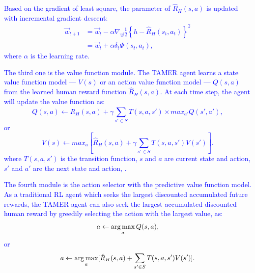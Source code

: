 \textcolor{blue}{Based on the gradient of least square, the parameter of $\hat{R}_{H}(s, a)$ is updated with incremental gradient descent:
\begin{equation}
\begin{aligned}
\vec{w}_{t+1} &= \vec{w}_{t} - \alpha\nabla_{\vec{w}} \frac{1}{2} \left\{h - \hat{R}_{H}(s_{t}, a_{t})\right\}^{2} \\
&= \vec{w}_{t} + \alpha \delta_{t}\Phi(s_{t},a_{t}),
\end{aligned}
\label{rupdate}
\end{equation}
where $\alpha$ is the learning rate.}

\textcolor{blue}{The third one is the value function module. The TAMER agent learns a state value function model --- $V(s)$ or an action value function model --- $Q(s,a)$ from the learned human reward function $\hat{R}_{H}(s, a)$. At each time step, the agent will update the value function as:
\begin{equation}
Q(s,a) \leftarrow \hat{R}_{H}(s, a)+\gamma \sum_{s' \in S}T(s,a,s') \times max_{a'}Q(s',a'), 
\end{equation}
or 
\begin{equation}
V(s) \leftarrow max_{a}[\hat{R}_{H}(s, a)+\gamma \sum_{s' \in S}T(s,a,s') V(s')].
\end{equation}
where $T(s,a,s')$ is the transition function, $s$ and $a$ are current state and action, $s'$ and $a'$ are the next state and action, .
}


\textcolor{blue}{The fourth module is the action selector with the predictive value function model. As a traditional RL agent which seeks the largest discounted accumulated future rewards, the TAMER agent can also seek the largest accumulated discounted human reward by greedily selecting the action with the largest value, as: %
\begin{equation}
a \leftarrow \operatorname*{arg\,max}_{a}Q(s, a),
\end{equation}
or 
\begin{equation}
a \leftarrow \operatorname*{arg\,max}_{a}[\hat{R}_{H}(s, a)+\sum_{s' \in S}T(s,a,s')V(s')]. 
\end{equation}
}

